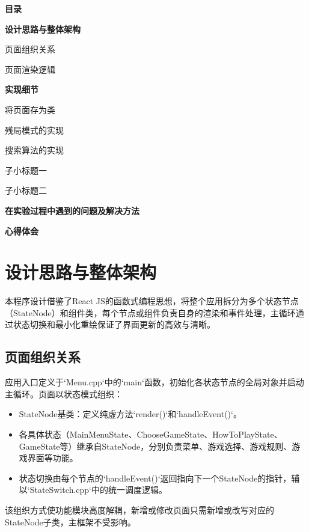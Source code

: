 \documentclass[12pt, a4paper]{article}
\begin{document}
\newpage
\setcounter{page}{1}
\begin{center}
    {\Large\bfseries\color{darkacademic} 目录}
\end{center}
\vspace{1cm}
\begin{mytoc}
    \item {\bfseries\color{academicblue} 设计思路与整体架构}
    \begin{mytoc}
        \item 页面组织关系
        \item 页面渲染逻辑
    \end{mytoc}
    \item {\bfseries\color{academicblue} 实现细节}
    \begin{mytoc}
        \item 将页面存为类
        \item 残局模式的实现
        \item 搜索算法的实现
        \begin{mytoc}
            \item 子小标题一
            \item 子小标题二
        \end{mytoc}
    \end{mytoc}
    \item {\bfseries\color{academicblue} 在实验过程中遇到的问题及解决方法}
    \item {\bfseries\color{academicblue} 心得体会}
\end{mytoc}

\section{设计思路与整体架构}

本程序设计借鉴了React JS的函数式编程思想，将整个应用拆分为多个状态节点（StateNode）和组件类，每个节点或组件负责自身的渲染和事件处理，主循环通过状态切换和最小化重绘保证了界面更新的高效与清晰。

\subsection{页面组织关系}
应用入口定义于`Menu.cpp`中的`main`函数，初始化各状态节点的全局对象并启动主循环。页面以状态模式组织：
\begin{itemize}
  \item StateNode基类：定义纯虚方法`render()`和`handleEvent()`。  \item 各具体状态（MainMenuState、ChooseGameState、HowToPlayState、GameState等）继承自StateNode，分别负责菜单、游戏选择、游戏规则、游戏界面等功能。  \item 状态切换由每个节点的`handleEvent()`返回指向下一个StateNode的指针，辅以`StateSwitch.cpp`中的统一调度逻辑。
\end{itemize}
该组织方式使功能模块高度解耦，新增或修改页面只需新增或改写对应的StateNode子类，主框架不受影响。
\end{document}

